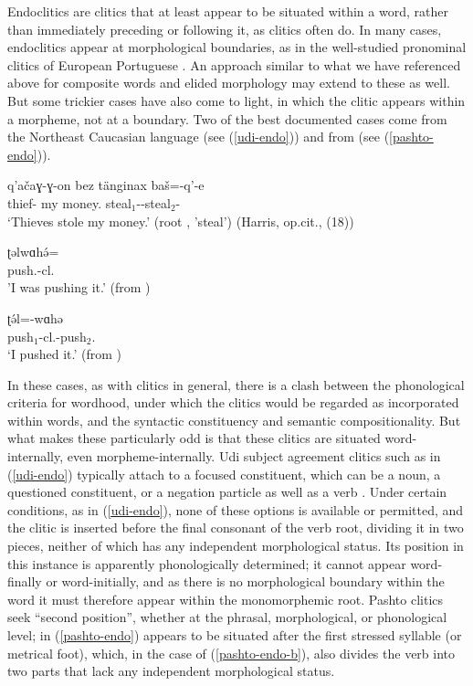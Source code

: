\documentclass[output=paper
                ,modfonts
                ,nonflat
	        ,collection
	        ,collectionchapter
	        ,collectiontoclongg
 	        ,biblatex
                ,babelshorthands
                ,newtxmath
                ,draftmode
                ,colorlinks, citecolor=brown
]{./langsci/langscibook}
\begin{document}
{
Endoclitics are clitics that at least appear to be situated within a word, rather than immediately
preceding or following it, as clitics often do.
In many cases, endoclitics appear at morphological boundaries, as in the well-studied pronominal clitics of European Portuguese  \citep{Crysmann2000a}. An approach similar to what we have referenced above for composite words and elided morphology may extend to these as well. But some trickier cases have also come to light, in which the clitic appears within a morpheme, not at a boundary. Two of the best documented cases come from the Northeast Caucasian language  \citep{Harris2000} (see (\ref{udi-endo})) and from  \citep{Tegey1977,Roberts2000,Dost2007} (see (\ref{pashto-endo})).

\ea
\label{udi-endo}
\gll q'a\v{c}aɣ-ɣ-on bez t\"{a}nginax ba\v{s}=-q'-e \\
     thief- my money. steal$_{1}$--steal$_{2}$- \\
\glt `Thieves stole my money.' (root , 'steal') (Harris, op.cit., (18))
\zcont

\ealcont
\label{pashto-endo}
\ex\label{pashto-endo-a}
\gll ʈəlwɑhə́= \\
     push.-cl. \\
\glt 'I was pushing it.' (from \citealt{Tegey1977,Dost2007})

\ex\label{pashto-endo-b}
\gll ʈə́l=-wɑhə \\
     push$_{1}$-cl.-push$_{2}$. \\
\glt `I pushed it.' (from \citealt{Tegey1977,Dost2007})
\zl

In these cases, as with clitics in general, there is a clash between the phonological criteria for wordhood, under which the clitics would be regarded as incorporated within words, and the syntactic constituency and semantic compositionality.
But what makes these particularly odd is that these clitics are situated word-internally, even morpheme-internally. 
Udi subject agreement clitics such as  in (\ref{udi-endo}) typically attach to a focused constituent, which can be a noun, a questioned constituent, or a negation particle as well as a verb \citep{Harris2000}.
Under certain conditions, as in (\ref{udi-endo}), none of these options is available or permitted, and the clitic is inserted before the final consonant of the verb root, dividing it in two pieces, neither of which has any independent morphological status.
Its position in this instance is apparently phonologically determined; it cannot appear word-finally or word-initially, and as there is no morphological boundary within the word it must therefore appear within the monomorphemic root.
Pashto clitics  seek ``second position'', whether at the phrasal, morphological, or phonological level;  in (\ref{pashto-endo}) appears to be situated after the first stressed syllable (or metrical foot), which, in the case of (\ref{pashto-endo-b}), also divides the verb into two parts that lack any independent morphological status.

}
\end{document}
